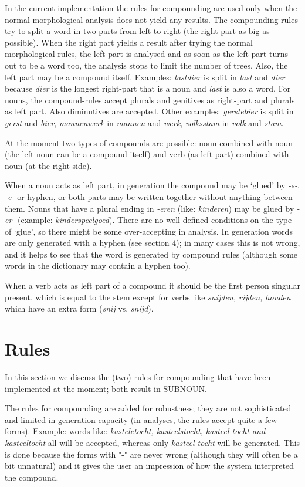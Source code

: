 In the current implementation the rules for compounding are used only when the
normal morphological analysis does not yield any results. The compounding rules
try to split a word in two parts from left to right (the right part as big as 
possible). When the right part yields a result after trying the normal 
morphological rules, the left part is analysed and as soon as the left part
turns out to be a word too, the analysis stops to limit the number of
trees. Also, the left part may
be a compound itself. Examples: {\em lastdier} is split in {\em last} and
{\em dier} because {\em dier} is the longest right-part that is a noun and
{\em last} is also a word. For nouns, the compound-rules accept plurals
and genitives as right-part and plurals as left part. Also diminutives are
accepted. Other examples: {\em gerstebier} is split in {\em gerst} and 
{\em bier}, {\em mannenwerk} in {\em mannen} and {\em werk}, {\em volksstam}
in {\em volk} and {\em stam}.

At the moment two types of compounds are possible: noun combined with noun
(the left noun can be a compound itself) and verb (as left part) 
combined with noun (at the right side).

When a noun acts as left part, in generation the compound may be `glued' by 
{\em -s-}, {\em -e-} or hyphen, or both parts may be written together
without anything between them. Nouns that have a plural ending in 
{\em -eren} (like: {\em kinderen}) may be glued by {\em -er-} (example:
{\em kinderspeelgoed}). There are no well-defined conditions on the type of 
`glue', so there might be some over-accepting in analysis. In 
generation words are only generated with a hyphen (see section 4); 
in many cases this is not
wrong, and it helps to see that the word is generated by compound rules 
(although some words in the dictionary may contain a hyphen too).

When a verb acts as left part of a compound it should be the first person
singular present, which is equal to the stem except for
verbs like {\em snijden, rijden, houden} which have an extra form ({\em snij}
vs. {\em snijd}).

\section{Rules}

In this section we discuss the (two) rules for compounding 
that have been implemented at the 
moment; both result in SUBNOUN.

The rules for compounding are added for robustness; they are
not sophisticated and limited in generation capacity (in analyses,
the rules accept quite a few forms). Example: words like:
{\em kasteletocht, kasteelstocht, kasteel-tocht and kasteeltocht}
all will be accepted, whereas only {\em kasteel-tocht} will be generated.
This is done because the forms with "-" are never wrong (although they
will often be a bit unnatural) and it gives the user an impression of
how the system interpreted the compound.
      

